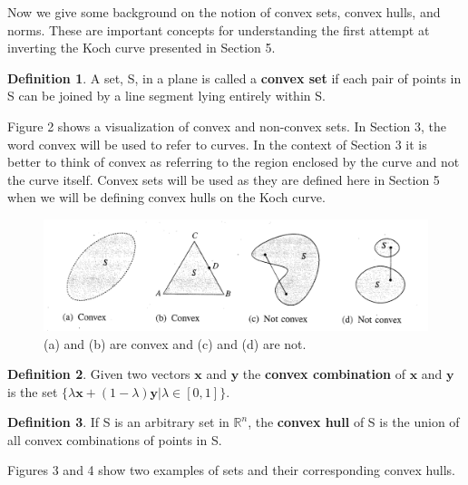 \documentclass{article}
\theoremstyle{definition}
\newtheorem{definition}{Definition}[section]
\begin{document}
\noindent Now we give some background on the notion of convex sets, convex hulls, and norms. These are important concepts for understanding the first attempt at inverting the Koch curve presented in Section 5.
\begin{definition}
    A set, S, in a plane is called a \textbf{convex set} if each pair of points in S can be joined by a line segment lying entirely within S.
\end{definition}
\noindent Figure 2 shows a visualization of convex and non-convex sets. In Section 3, the word convex will be used to refer to curves. In the context of Section 3 it is better to think of convex as referring to the region enclosed by the curve and not the curve itself. Convex sets will be used as they are defined here in Section 5 when we will be defining convex hulls on the Koch curve.
\begin{figure}[h]
    \centering
    \includegraphics[width=1\textwidth]{ConvexImage.png}
    \caption{(a) and (b) are convex and (c) and (d) are not. \cite{sydsæter2005further}}
\end{figure}
\begin{definition}
    Given two vectors $\mathbf{x}$ and $\mathbf{y}$ the \textbf{convex combination} of $\mathbf{x}$ and $\mathbf{y}$ is the set $\{\lambda \mathbf{x} + (1 - \lambda)\mathbf{y}|\lambda \in [0, 1]\}$.
\end{definition}
\begin{definition}
    If S is an arbitrary set in $\mathbb{R}^n$, the \textbf{convex hull} of S is the union of all convex combinations of points in S.
\end{definition}
\noindent Figures 3 and 4 show two examples of sets and their corresponding convex hulls.
\end{document}
